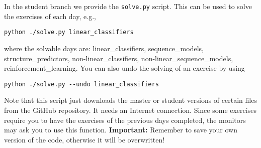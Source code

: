 In the student branch we provide the \verb+solve.py+ script. This can be used
to solve the exercises of each day, e.g.,

\begin{verbatim}
python ./solve.py linear_classifiers
\end{verbatim}

\noindent where the solvable days are: linear\_classifiers, sequence\_models, structure\_predictors, non-linear\_classifiers, non-linear\_sequence\_models, reinforcement\_learning. You can also undo the solving of an exercise by using

\begin{verbatim}
python ./solve.py --undo linear_classifiers
\end{verbatim}

Note that this script just downloads the master or student versions of certain files from the GitHub repository. It needs an Internet connection. Since some exercises require you to have the exercises of the previous days completed, the monitors may ask you to use this function. \textbf{Important:} Remember to save your own version of the code, otherwise it will be overwritten!
